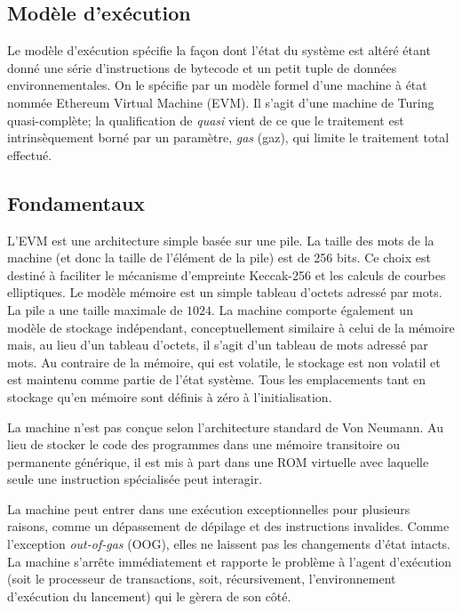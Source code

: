 \documentclass[9pt,oneside]{amsart}
\begin{document}
\begin{multicols}{2}
\section{Modèle d'exécution} \label{ch:model}

Le modèle d'exécution spécifie la façon dont l'état du système est altéré étant donné une série d'instructions de bytecode et un petit tuple de données environnementales. On le spécifie par un modèle formel d'une machine à état nommée Ethereum Virtual Machine (EVM). Il s'agit d'une machine de Turing quasi-complète; la qualification de \textit{quasi} vient de ce que le traitement est intrinsèquement borné par un paramètre, \textit{gas} (gaz), qui limite le traitement total effectué.

\subsection{Fondamentaux}

L'EVM est une architecture simple basée sur une pile. La taille des mots de la machine (et donc la taille de l'élément de la pile) est de 256 bits. Ce choix est destiné à faciliter le mécanisme d'empreinte Keccak-256 et les calculs de courbes elliptiques. Le modèle mémoire est un simple tableau d'octets adressé par mots. La pile a une taille maximale de $1024$. La machine comporte également un modèle de stockage indépendant, conceptuellement similaire à celui de la mémoire mais, au lieu d'un tableau d'octets, il s'agit d'un tableau de mots adressé par mots. Au contraire de la mémoire, qui est volatile, le stockage est non volatil et est maintenu comme partie de l'état système. Tous les emplacements tant en stockage qu'en mémoire sont définis à zéro à l'initialisation.

La machine n'est pas conçue selon l'architecture standard de Von Neumann. Au lieu de stocker le code des programmes dans une mémoire transitoire ou permanente générique, il est mis à part dans une ROM virtuelle avec laquelle seule une instruction spécialisée peut interagir.

La machine peut entrer dans une exécution exceptionnelles pour plusieurs raisons, comme un dépassement de dépilage et des instructions invalides. Comme l'exception \textit{out-of-gas} (OOG), elles ne laissent pas les changements d'état intacts. La machine s'arrête immédiatement et rapporte le problème à l'agent d'exécution (soit le processeur de transactions, soit, récursivement, l'environnement d'exécution du lancement) qui le gèrera de son côté.


\end{multicols}
\end{document}
